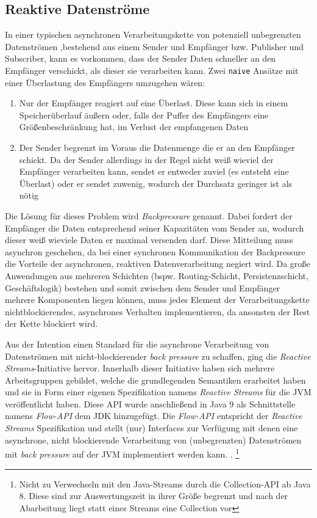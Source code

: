 \subsection{Reaktive Datenströme}
\label{section:reaktive_datenströme}
In einer typischen asynchronen Verarbeitungskette von potenziell unbegrenzten Datenströmen
,bestehend aus einem Sender und Empfänger bzw. Publisher und Subscriber, kann es vorkommen,
dass der Sender Daten schneller an den Empfänger verschickt, als dieser sie verarbeiten kann.
Zwei \verb|naive| Ansätze mit einer Überlastung des Empfängers umzugehen wären:
\begin{enumerate}
  \item Nur der Empfänger reagiert auf eine Überlast. Diese kann sich in einem Speicherüberlauf äußern oder, falls der Puffer des Empfängers eine Größenbeschränkung
        hat, im Verlust der empfangenen Daten
  \item Der Sender begrenzt im Voraus die Datenmenge die er an den Empfänger schickt. Da der Sender allerdings in der Regel nicht weiß wieviel der Empfänger
        verarbeiten kann, sendet er entweder zuviel (es entsteht eine Überlast) oder er sendet zuwenig, wodurch der Durchsatz geringer ist als nötig \parencite{JavaSpektrum2015}
\end{enumerate}
Die Lösung für dieses Problem wird \textit{Backpressure} genannt.
Dabei fordert der Empfänger die Daten entsprechend seiner Kapazitäten vom Sender an, wodurch dieser weiß wieviele Daten er maximal versenden darf.
Diese Mitteilung muss asynchron geschehen, da bei einer synchronen Kommunikation der Backpressure die Vorteile der asynchronen, reaktiven Datenverarbeitung
negiert wird.
Da große Anwendungen aus mehreren Schichten (bspw. Routing-Schicht, Persistenzschicht, Geschäftslogik) bestehen und somit zwischen
dem Sender und Empfänger mehrere Komponenten liegen können, muss jedes
Element der Verarbeitungskette nichtblockierendes, asynchrones Verhalten implementieren, da ansonsten der Rest der Kette blockiert wird.

Aus der Intention einen Standard für die asynchrone Verarbeitung von Datenströmen mit nicht-blockierender \textit{back pressure}
zu schaffen, ging die \textit{Reactive Streams}-Initiative hervor.
Innerhalb dieser Initiative haben sich mehrere Arbeitsgruppen gebildet, welche die grundlegenden Semantiken erarbeitet haben und
sie in Form einer eigenen Spezifikation namens \textit{Reactive Streams} für die JVM veröffentlicht haben.\parencite{ReactiveStreams}
Diese API wurde anschließend in Java 9 als Schnittstelle namens \textit{Flow-API} dem JDK hinzugefügt.
Die \textit{Flow-API} entspricht der \textit{Reactive Streams} Spezifikation und stellt (nur) Interfaces zur Verfügung mit denen eine
asynchrone, nicht blockierende Verarbeitung von (unbegrenzten) Datenströmen mit \textit{back pressure} auf der JVM implementiert werden kann.
\parencite{OracleFlow}.
\footnote{Nicht zu Verwechseln mit den Java-Streams durch die Collection-API ab Java 8. Diese sind zur Auswertungszeit in ihrer Größe begrenzt und
  nach der Abarbeitung liegt statt eines Streams eine Collection vor}

